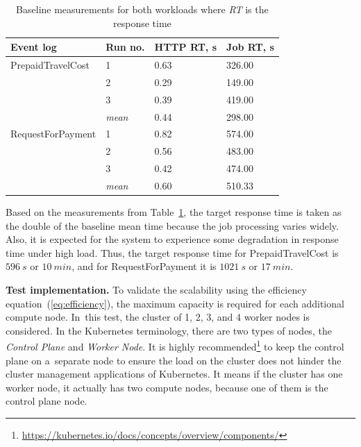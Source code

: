 \documentclass[12pt]{article}
\begin{document}
\begin{table}[h]
    \footnotesize
    \centering
    \begin{tabular}{|p{4cm}|p{2.5cm}|p{2.5cm}|p{2.5cm}|}
        \hline
        \textbf{Event log} & \textbf{Run no.} & \textbf{HTTP RT, s} & \textbf{Job RT, s}  \\
        \hline
        \hline
        PrepaidTravelCost & 1 & 0.63 & 326.00 \\
         & 2 & 0.29 & 149.00 \\
         & 3 & 0.39 & 419.00 \\
         \cline{2-4}
         & \textit{mean} & 0.44 & 298.00 \\
        \hline
        \hline
        RequestForPayment & 1 & 0.82 & 574.00 \\
         & 2 & 0.56 & 483.00 \\
         & 3 & 0.42 & 474.00 \\
         \cline{2-4}
         & \textit{mean} & 0.60 & 510.33 \\
        \hline
    \end{tabular}
    \caption{Baseline measurements for both workloads where \emph{RT} is the response time}
    \label{tab:baseline}
\end{table}

\noindent
Based on the measurements from Table~\ref{tab:baseline}, the target response time is taken as the double of the baseline mean time because the job processing varies widely. Also, it is expected for the system to experience some degradation in response time under high load. Thus, the target response time for PrepaidTravelCost is $596~s$ or $10~min$, and for RequestForPayment it is $1021~s$ or $17~min$.

\textbf{Test implementation.} To validate the scalability using the efficiency equation~(\ref{eq:efficiency}), the maximum capacity is required for each additional compute node. In~this test, the cluster of 1, 2, 3, and 4 worker nodes is considered. In the Kubernetes terminology, there are two types of nodes, the \emph{Control Plane} and \emph{Worker Node}. It is highly recommended\footnote{\href{https://kubernetes.io/docs/concepts/overview/components/}{https://kubernetes.io/docs/concepts/overview/components/}} to keep the control plane on a~separate node to ensure the load on the cluster does not hinder the cluster management applications of Kubernetes. It means if the cluster has one worker node, it actually has two compute nodes, because one of them is the control plane node.
\end{document}
